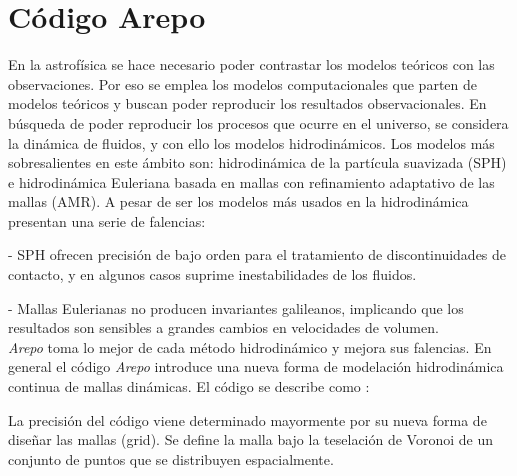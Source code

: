 \section{Código Arepo}
\label{sec: codigo arepo}


En la astrofísica se hace necesario poder contrastar los modelos teóricos con las observaciones. Por eso se emplea los modelos computacionales que parten de  modelos teóricos y buscan poder reproducir los resultados observacionales. En búsqueda de poder reproducir los procesos que ocurre en el universo, se considera la dinámica de fluidos, y con ello los modelos hidrodinámicos. Los modelos más sobresalientes en este ámbito son: hidrodinámica de la partícula suavizada (SPH) \cite{monaghan1992} e hidrodinámica Euleriana basada en mallas \cite{stone2008} con refinamiento adaptativo de las mallas (AMR). A pesar de ser los modelos más usados en la hidrodinámica presentan una serie de falencias:

- SPH ofrecen precisión de bajo orden para el tratamiento de discontinuidades de contacto, y en algunos casos suprime inestabilidades de los fluidos.

- Mallas Eulerianas no producen invariantes galileanos, implicando que los resultados son sensibles a grandes cambios en velocidades de volumen.\\

{\it{Arepo}} toma lo mejor de cada método hidrodinámico y mejora sus falencias. En general el código {\it{Arepo}} introduce una nueva forma de modelación hidrodinámica continua de mallas dinámicas. El código se describe como \cite{springel2010}:

La precisión del código viene determinado mayormente por su nueva forma de diseñar las mallas (grid). Se define la malla bajo la teselación de Voronoi de un conjunto de puntos que se distribuyen espacialmente.

